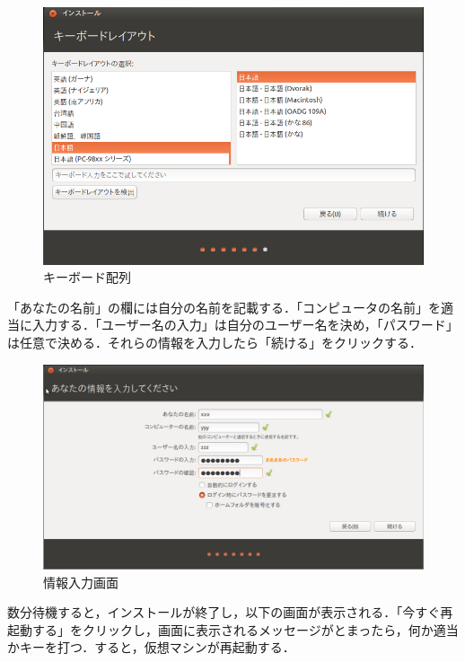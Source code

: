 \begin{figure}[htb]
\centering
\includegraphics[width=15cm]{ubuntuinstall5.png}
\caption{キーボード配列}\label{キーボード配列}
\end{figure}


「あなたの名前」の欄には自分の名前を記載する．「コンピュータの名前」を適当に入力する．「ユーザー名の入力」は自分のユーザー名を決め，「パスワード」は任意で決める．それらの情報を入力したら「続ける」をクリックする．


\begin{figure}[htb]
\centering
\includegraphics[width=15cm]{ubuntuinstall6.png}
\caption{情報入力画面}\label{情報入力画面}
\end{figure}


数分待機すると，インストールが終了し，以下の画面が表示される．「今すぐ再起動する」をクリックし，画面に表示されるメッセージがとまったら，何か適当かキーを打つ．すると，仮想マシンが再起動する．


